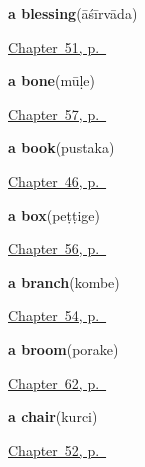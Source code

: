 \noindent\begin{minipage}[t]{\linewidth}
\raggedright
\textbf{a blessing}\enspace\emph{}\enspace(āśīrvāda)\par
\footnotesize \hyperref[ch:ka-courtesy]{Chapter~51, p.~\pageref*{ch:ka-courtesy}}
\end{minipage}\par\smallskip

\noindent\begin{minipage}[t]{\linewidth}
\raggedright
\textbf{a bone}\enspace\emph{}\enspace(mūḷe)\par
\footnotesize \hyperref[ch:ka-more-body]{Chapter~57, p.~\pageref*{ch:ka-more-body}}
\end{minipage}\par\smallskip

\noindent\begin{minipage}[t]{\linewidth}
\raggedright
\textbf{a book}\enspace\emph{}\enspace(pustaka)\par
\footnotesize \hyperref[ch:ka-ask-for]{Chapter~46, p.~\pageref*{ch:ka-ask-for}}
\end{minipage}\par\smallskip

\noindent\begin{minipage}[t]{\linewidth}
\raggedright
\textbf{a box}\enspace\emph{}\enspace(peṭṭige)\par
\footnotesize \hyperref[ch:ka-house]{Chapter~56, p.~\pageref*{ch:ka-house}}
\end{minipage}\par\smallskip

\noindent\begin{minipage}[t]{\linewidth}
\raggedright
\textbf{a branch}\enspace\emph{}\enspace(kombe)\par
\footnotesize \hyperref[ch:ka-tree]{Chapter~54, p.~\pageref*{ch:ka-tree}}
\end{minipage}\par\smallskip

\noindent\begin{minipage}[t]{\linewidth}
\raggedright
\textbf{a broom}\enspace\emph{}\enspace(porake)\par
\footnotesize \hyperref[ch:ka-made]{Chapter~62, p.~\pageref*{ch:ka-made}}
\end{minipage}\par\smallskip

\noindent\begin{minipage}[t]{\linewidth}
\raggedright
\textbf{a chair}\enspace\emph{}\enspace(kurci)\par
\footnotesize \hyperref[ch:ka-welcome]{Chapter~52, p.~\pageref*{ch:ka-welcome}}
\end{minipage}\par\smallskip

